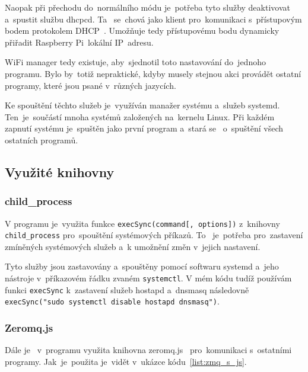 Naopak při přechodu do~normálního  módu je~potřeba tyto služby deaktivovat a~spustit službu dhcpcd. Ta ~se~chová jako klient pro~komunikaci s~přístupovým bodem protokolem DHCP~\cite{dhcpcd}. Umožňuje tedy přístupovému bodu dynamicky přiřadit Raspberry Pi~lokální IP~adresu.

WiFi manager tedy existuje, aby~sjednotil toto nastavování do~jednoho programu. Bylo by~totiž nepraktické, kdyby musely stejnou akci provádět ostatní programy, které jsou psané v~různých jazycích.

Ke spouštění těchto služeb je~využíván manažer systému a~služeb systemd. Ten~je~součástí mnoha systémů založených na~kernelu Linux. Při každém zapnutí systému je~spuštěn jako první program a~stará se ~o~spuštění všech ostatních programů.~\cite{systemd}

\subsection{Využité knihovny}
\subsubsection{child\_process}
V programu je~využita funkce \texttt{execSync(command[, options])} z~knihovny \texttt{child_process} pro~spouštění systémových příkazů. To ~je~potřeba pro~zastavení zmíněných systémových služeb a~k umožnění změn v~jejich nastavení.

Tyto služby jsou zastavovány a~spouštěny pomocí softwaru systemd a~jeho nástroje v~příkazovém řádku zvaném \texttt{systemctl}.
V mém kódu tudíž používám funkci \texttt{execSync} k~zastavení služeb hostapd a~dnsmasq následovně \texttt{execSync("sudo systemctl disable hostapd dnsmasq")}.

\subsubsection{Zeromq.js}
Dále je ~v~programu využita knihovna zeromq.js~\cite{zeromqjs} pro~komunikaci s~ostatními programy. Jak~je~použita je~vidět v~ukázce kódu~\ref{list:zmq_s_js}.

\begin{code}
  \inputminted[frame=lines,fontsize=\footnotesize{}, linenos, breaklines]{js}{code_examples/zmq_server.js}
\end{code}

